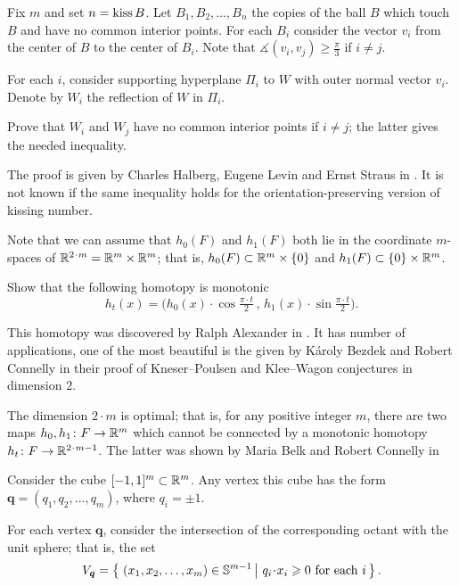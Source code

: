 Fix $m$ and set $n=\mathop{\rm kiss} B$.
Let $B_1,B_2,\dots, B_n$ the copies of the ball $B$  
which touch $B$ and have no common interior points.
For each $B_i$ consider the vector $v_i$ from the center of $B$ to the center of $B_i$.
Note that $\measuredangle(v_i,v_j)\ge \tfrac\pi3$ if $i\ne j$.

For each $i$,
consider supporting hyperplane $\Pi_i$
to $W$
with outer normal vector $v_i$.
Denote by $W_i$ the reflection of $W$ in $\Pi_i$.

Prove that $W_i$ and $W_j$ have no common interior points if $i\ne j$;
the latter gives the needed inequality.
\qeds

The proof is given by 
Charles Halberg, 
Eugene Levin 
and Ernst Straus 
in \cite{halberg-levin-straus}.
It is not known if the same inequality holds for the orientation-preserving version of kissing number.



Note that we can assume
that $h_0(F)$ and $h_1(F)$ both lie in the coordinate $m$-spaces of $\RR^{2\cdot m}=\RR^m\times \RR^m$;
that is,
$h_0(F)\z\subset\RR^m\times\{0\}$
and $h_1(F)\subset  \{0\}\times\mathbb{R}^m$.

Show that the following homotopy is monotonic
\[h_t(x)=\bigl(h_0(x)\cdot \cos\tfrac{\pi\cdot t}2
\,,\,
 h_1(x)\cdot\sin\tfrac{\pi\cdot t}{2}\bigr).\] 
\qedsf

This homotopy was discovered by Ralph Alexander in \cite{ralexander}.
It has number of applications, 
one of the most beautiful is the given 
by K\'aroly Bezdek 
and Robert Connelly \cite{bezdek-connelly} 
in their proof of 
Kneser--Poulsen  
and Klee--Wagon conjectures in dimension $2$.

The dimension $2\cdot m$ is optimal;
that is, for any positive integer $m$,
there are two maps $h_0,h_1\colon F\to \mathbb{R}^m$ which cannot be connected by a monotonic homotopy $h_t\:F\to\RR^{2\cdot m-1}$.
The latter was shown by Maria Belk and Robert Connelly in \cite{belk-connelly}



Consider the cube $[-1,1]^m\subset \mathbb{R}^m$.
Any vertex this cube has the form $\bm{q}=(q_1,q_2,\dots,q_m)$,
where  $q_i=\pm1$.

For each vertex $\bm{q}$,
consider the intersection of the corresponding octant with the unit sphere;
that is, the set
\[V_{\bm{q}}=\set{(x_1,x_2,\dots,x_m)\in\mathbb{S}^{m-1}}{q_i\cdot x_i\ge 0\ \text{for each}\ i}.\]

